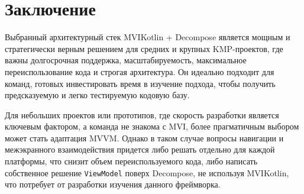 \documentclass[14pt, russian]{scrartcl}
\begin{document}
\section{Заключение}

Выбранный архитектурный стек MVIKotlin + Decompose является мощным и стратегически верным решением для средних и крупных KMP-проектов, где важны долгосрочная поддержка, масштабируемость, максимальное переиспользование кода и строгая архитектура. Он идеально подходит для команд, готовых инвестировать время в изучение подхода, чтобы получить предсказуемую и легко тестируемую кодовую базу.

Для небольших проектов или прототипов, где скорость разработки является ключевым фактором, а команда не знакома с MVI, более прагматичным выбором может стать адаптация MVVM. Однако в таком случае вопросы навигации и межэкранного взаимодействия придется либо решать отдельно для каждой платформы, что снизит объем переиспользуемого кода, либо написать собственное решение \texttt{ViewModel} поверх Decompose, не используя MVIKotlin, что потребует от разработки изучения данного фреймворка.
\end{document}
